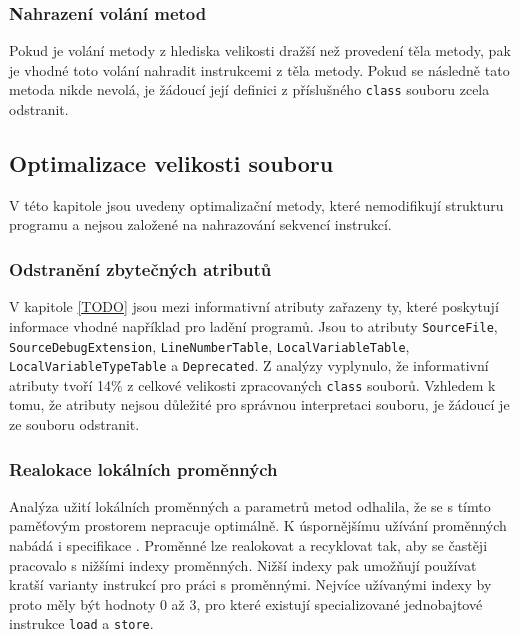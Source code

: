 \subsubsection{Nahrazení volání metod}
Pokud je volání metody z hlediska velikosti dražší než provedení těla metody, pak je vhodné toto volání nahradit instrukcemi z těla metody. Pokud se následně tato metoda nikde nevolá, je žádoucí její definici z příslušného \texttt{class} souboru zcela odstranit.


\subsection{Optimalizace velikosti souboru}

V této kapitole jsou uvedeny optimalizační metody, které nemodifikují strukturu programu a nejsou založené na nahrazování sekvencí instrukcí.


\subsubsection{Odstranění zbytečných atributů}
V kapitole \ref{TODO} jsou mezi informativní atributy zařazeny ty, které poskytují informace vhodné například pro ladění programů. Jsou to atributy \texttt{SourceFile}, \texttt{SourceDebugExtension}, \texttt{LineNumberTable}, \texttt{LocalVariableTable}, \texttt{LocalVariableTypeTable} a \texttt{Deprecated}.  Z analýzy vyplynulo, že informativní atributy tvoří 14\% z celkové velikosti zpracovaných \texttt{class} souborů. Vzhledem k tomu, že atributy nejsou důležité pro správnou interpretaci souboru, je žádoucí je ze souboru odstranit.

\subsubsection{Realokace lokálních proměnných}
Analýza užití lokálních proměnných a parametrů metod odhalila, že se s tímto paměťovým prostorem nepracuje optimálně. K úspornějšímu užívání proměnných nabádá i specifikace \cite{Lindholm:JVM}. Proměnné lze realokovat a recyklovat tak, aby se častěji pracovalo s nižšími indexy proměnných. Nižší indexy pak umožňují používat kratší varianty instrukcí pro práci s proměnnými. Nejvíce užívanými indexy by proto měly být hodnoty 0 až 3, pro které existují specializované jednobajtové instrukce \texttt{load} a \texttt{store}. 


